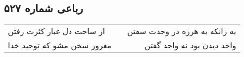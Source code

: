 \begin{center}
\section*{رباعی شماره ۵۲۷}
\label{sec:sh527}
\begin{longtable}{l p{0.5cm} r}
از ساحت دل غبار کثرت رفتن
&&
به زانکه به هرزه در وحدت سفتن
\\
مغرور سخن مشو که توحید خدا
&&
واحد دیدن بود نه واحد گفتن
\\
\end{longtable}
\end{center}
